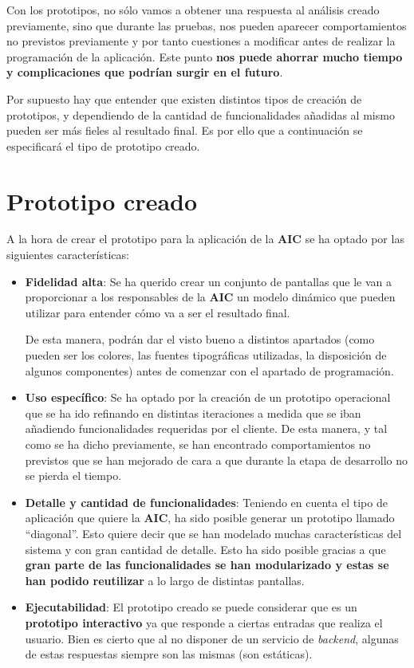 \documentclass{\ClassPath/viu-tfm-template}
\begin{document}
Con los prototipos, no sólo vamos a obtener una respuesta al análisis creado previamente, sino que durante las pruebas, nos pueden aparecer comportamientos no previstos previamente y por tanto cuestiones a modificar antes de realizar la programación de la aplicación. Este punto \textbf{nos puede ahorrar mucho tiempo y complicaciones que podrían surgir en el futuro}.

Por supuesto hay que entender que existen distintos tipos de creación de prototipos, y dependiendo de la cantidad de funcionalidades añadidas al mismo pueden ser más fieles al resultado final. Es por ello que a continuación se especificará el tipo de prototipo creado.


\section{Prototipo creado}

A la hora de crear el prototipo para la aplicación de la \textbf{AIC} se ha optado por las siguientes características:

\vspace{-1em}
\begin{itemize}
    \item \textbf{Fidelidad alta}: Se ha querido crear un conjunto de pantallas que le van a proporcionar a los responsables de la \textbf{AIC} un modelo dinámico que pueden utilizar para entender cómo va a ser el resultado final.

    De esta manera, podrán dar el visto bueno a distintos apartados (como pueden ser los colores, las fuentes tipográficas utilizadas, la disposición de algunos componentes) antes de comenzar con el apartado de programación.

    \item \textbf{Uso específico}: Se ha optado por la creación de un prototipo operacional que se ha ido refinando en distintas iteraciones a medida que se iban añadiendo funcionalidades requeridas por el cliente. De esta manera, y tal como se ha dicho previamente, se han encontrado comportamientos no previstos que se han mejorado de cara a que durante la etapa de desarrollo no se pierda el tiempo.

    \item \textbf{Detalle y cantidad de funcionalidades}: Teniendo en cuenta el tipo de aplicación que quiere la \textbf{AIC}, ha sido posible generar un prototipo llamado “diagonal”. Esto quiere decir que se han modelado muchas características del sistema y con gran cantidad de detalle. Esto ha sido posible gracias a que \textbf{gran parte de las funcionalidades se han modularizado y estas se han podido reutilizar} a lo largo de distintas pantallas.

    \item \textbf{Ejecutabilidad}: El prototipo creado se puede considerar que es un \textbf{prototipo interactivo} ya que responde a ciertas entradas que realiza el usuario. Bien es cierto que al no disponer de un servicio de \textit{backend}, algunas de estas respuestas siempre son las mismas (son estáticas).
\end{itemize}
\end{document}
